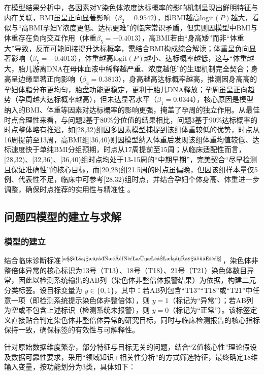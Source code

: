 \documentclass[withoutpreface,bwprint]{cumcmthesis} %
\begin{document}
在模型结果分析中，各因素对Y染色体浓度达标概率的影响机制呈现出鲜明特征与内在关联，BMI虽呈正向显著影响（$\beta_2=0.9542$），即BMI越高$\text{logit}(P)$越大，看似与“高BMI孕妇Y浓度更低、达标更难”的临床常识矛盾，但实则因模型中BMI与体重存在负向交互作用（体重$\beta_5=-0.4013$），高BMI若由“身高矮”而非“体重大”导致，反而可能间接提升达标概率，需结合BMI构成综合解读；体重呈负向显著影响（$\beta_5=-0.4013$），体重越高$\text{logit}(P)$越小、达标概率越低，这与“体重越大，胎儿游离DNA在母体血液中稀释越严重、浓度越低”的生理机制完全契合；身高呈边缘显著正向影响（$\beta_4=0.3813$），身高越高达标概率越高，推测因身高高的孕妇体脂分布更均匀，胎盘功能更稳定，更利于胎儿DNA释放；孕周虽呈正向趋势（孕周越大达标概率越高），但未达显著水平（$\beta_1=0.0344$），核心原因是模型纳入的BMI、体重等因素对达标概率的影响更强，掩盖了孕周的独立作用。从最佳时点合理性来看，与问题2基于80\%分位值的结果相比，问题3基于90\%达标概率的时点整体略有推迟，如[28,32)组因多因素模型捕捉到该组体重较低的优势，时点从16周提前至13周，高BMI组[36,40)则因模型纳入体重后发现该组体重均值较低、达标速度快于单纯BMI分组预期，时点从17周提前至15周；从临床适配性而言，[28,32)、[32,36)、[36,40)组时点均处于13-15周的“中期早期”，完美契合“尽早检测且保证准确性”的核心目标，而[20,28)组21.5周的时点虽偏晚，但因该组样本量仅5例、代表性不足，临床中可参考[28,32)组时点，并结合孕妇个体身高、体重进一步调整，确保时点推荐的实用性与精准性 。



\subsection{问题四模型的建立与求解}

\subsubsection{模型的建立}

结合临床诊断标准$^\text{\cite{染色体核型检验诊断报告模式专家共识}}$，染色体非整倍体异常的核心标识为13号（T13）、18号（T18）、21号（T21）染色体数目异常，因此以检测系统输出的AB列（染色体非整倍体报警结果）为依据，构建二元分类标签。设目标变量为 $ y \in \{0,1\} $，其中：若AB列包含“T13”“T18”或“T21”中任意一项（即检测系统提示染色体非整倍体），则 $ y=1 $（标记为“异常”）；若AB列为空或不包含上述标识（检测系统未报警），则 $ y=0 $（标记为“正常”）。该标签定义直接贴合判定染色体非整倍体异常的研究目标，同时与临床检测报告的核心指标保持一致，确保标签的有效性与可解释性。

针对原始数据维度繁杂，部分特征与目标无关的问题，结合“Z值核心性”理论假设及数据可靠性要求，采用“领域知识+相关性分析”的方式筛选特征，最终确定18维输入变量，按功能划分为3类，具体如下：  
\end{document}
